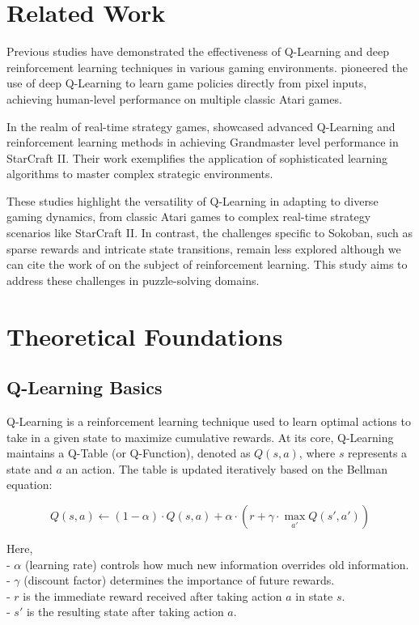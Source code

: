 \documentclass[10pt,twocolumn]{article}
\begin{document}
\section{Related Work}

Previous studies have demonstrated the effectiveness of Q-Learning and deep reinforcement learning techniques in various gaming environments. \textcite{mnih2013playing} pioneered the use of deep Q-Learning to learn game policies directly from pixel inputs, achieving human-level performance on multiple classic Atari games.

In the realm of real-time strategy games, \textcite{vinyals2019grandmaster} showcased advanced Q-Learning and reinforcement learning methods in achieving Grandmaster level performance in StarCraft II. Their work exemplifies the application of sophisticated learning algorithms to master complex strategic environments.

These studies highlight the versatility of Q-Learning in adapting to diverse gaming dynamics, from classic Atari games to complex real-time strategy scenarios like StarCraft II. In contrast, the challenges specific to Sokoban, such as sparse rewards and intricate state transitions, remain less explored although we can cite the work of \textcite{racaniere2017imagination} on the subject of reinforcement learning. This study aims to address these challenges in puzzle-solving domains.

\section{Theoretical Foundations}

\subsection{Q-Learning Basics}

Q-Learning is a reinforcement learning technique used to learn optimal actions to take in a given state to maximize cumulative rewards. At its core, Q-Learning maintains a Q-Table (or Q-Function), denoted as \( Q(s, a) \), where \( s \) represents a state and \( a \) an action. The table is updated iteratively based on the Bellman equation:

\[
    Q(s, a) \leftarrow (1 - \alpha) \cdot Q(s, a) + \alpha \cdot \left( r + \gamma \cdot \max_{a'} Q(s', a') \right)
\]

Here, \\
- \( \alpha \) (learning rate) controls how much new information overrides old information. \\
- \( \gamma \) (discount factor) determines the importance of future rewards. \\
- \( r \) is the immediate reward received after taking action \( a \) in state \( s \). \\
- \( s' \) is the resulting state after taking action \( a \). \\
\end{document}
